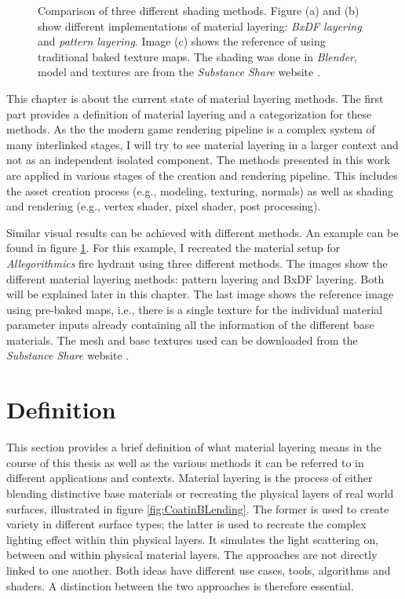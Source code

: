 \begin{figure}
		\caption{Comparison of three different shading methods. Figure (a) and (b) show different implementations of material layering: \emph{BxDF layering} and \emph{pattern layering}. Image (c) shows the reference of using traditional baked texture maps. The shading was done in \emph{Blender}, model and textures are from the \emph{Substance Share} website \cite{allegorithmic2017hydrant}.}
		\label{fig:approachesFireHydrant}
	\end{figure}


This chapter is about the current state of material layering methods. The first part provides a definition of material layering and a categorization for these methods. As the the modern game rendering pipeline is a complex system of many interlinked stages, I will try to see material layering in a larger context and not as an independent isolated component. The methods presented in this work are applied in various stages of the creation and rendering pipeline. This includes the asset creation process (e.g., modeling, texturing, normals) as well as shading and rendering (e.g., vertex shader, pixel shader, post processing).
	
Similar visual results can be achieved with different methods. An example can be found in figure \ref{fig:approachesFireHydrant}. For this example, I recreated the material setup for \emph{Allegorithmics} fire hydrant using three different methods. The images show the different material layering methods: pattern layering and BxDF layering. Both will be explained later in this chapter. The last image shows the reference image using pre-baked maps, i.e., there is a single texture for the individual material parameter inputs already containing all the information of the different base materials. The mesh and base textures used can be downloaded from the \emph{Substance Share} website \cite{allegorithmic2017hydrant}. 


\section{Definition}

This section provides a brief definition of what material layering means in the course of this thesis as well as the various methods it can be referred to in different applications and contexts. Material layering is the process of either blending distinctive base materials or recreating the physical layers of real world surfaces, illustrated in figure \ref{fig:CoatinBLending}. The former is used to create variety in different surface types; the latter is used to recreate the complex lighting effect within thin physical layers. It simulates the light scattering on, between and within physical material layers. The approaches are not directly linked to one another. Both ideas have different use cases, tools, algorithms and shaders. A distinction between the two approaches is therefore essential. 
	
